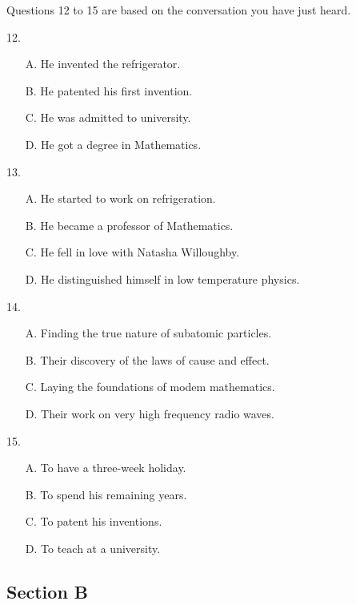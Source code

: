 \documentclass[UTF8,11pt]{ctexart}
\begin{document}
Questions 12 to 15 are based on the conversation you have just heard.


12.


\begin{itemize}[leftmargin=2em,itemsep=.2em,topsep=.4em]\item[A.] He invented the refrigerator.
\item[B.] He patented his first invention.
\item[C.] He was admitted to university.
\item[D.] He got a degree in Mathematics.
\end{itemize}

13.


\begin{itemize}[leftmargin=2em,itemsep=.2em,topsep=.4em]\item[A.] He started to work on refrigeration.
\item[B.] He became a professor of Mathematics.
\item[C.] He fell in love with Natasha Willoughby.
\item[D.] He distinguished himself in low temperature physics.
\end{itemize}

14.


\begin{itemize}[leftmargin=2em,itemsep=.2em,topsep=.4em]\item[A.] Finding the true nature of subatomic particles.
\item[B.] Their discovery of the laws of cause and effect.
\item[C.] Laying the foundations of modem mathematics.
\item[D.] Their work on very high frequency radio waves.
\end{itemize}

15.


\begin{itemize}[leftmargin=2em,itemsep=.2em,topsep=.4em]\item[A.] To have a three-week holiday.
\item[B.] To spend his remaining years.
\item[C.] To patent his inventions.
\item[D.] To teach at a university.
\end{itemize}

\subsection*{\textbf{Section B}}
\end{document}
